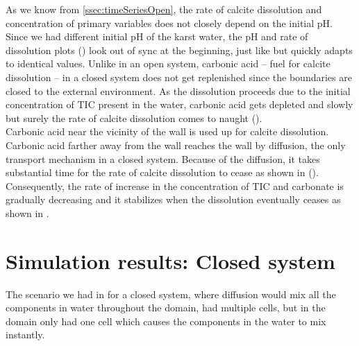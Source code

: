 As we know from \ref{ssec:timeSeriesOpen}, the rate of calcite dissolution and concentration of primary variables 
does not closely depend on the initial pH. Since we had different initial pH of the karst water, the pH and rate of 
dissolution plots () look out of sync at the beginning, just 
like  but quickly adapts to identical values. 
Unlike in an open system, carbonic acid -- fuel for calcite dissolution -- in a closed system does not get replenished since 
the boundaries are closed to the external environment. As the dissolution proceeds due to the initial concentration 
of TIC present in the water, carbonic acid gets depleted and slowly but surely the rate of calcite dissolution comes to naught (). \\

Carbonic acid near the vicinity of the wall is used up for calcite dissolution. Carbonic acid farther away from the wall reaches the wall by 
diffusion, the only transport mechanism in a closed system. Because of the diffusion, it takes substantial time for 
the rate of calcite dissolution to cease as shown in (). Consequently, the rate of increase in the concentration of TIC and carbonate 
is gradually decreasing and it stabilizes when the dissolution eventually ceases as shown in .


\section{\MATLAB Simulation results: Closed system}
The scenario we had in \DuMuX for a closed system, where diffusion would mix all the components in water throughout the domain, 
had multiple cells, but in \MATLAB the domain only had one cell which causes the components in the water to mix instantly. \\

